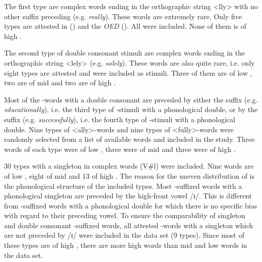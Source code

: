 The first type are complex words ending in the orthographic string <lly> with no other suffix preceding  (e.g. \textit{really}). These words are extremely rare. Only five types are attested  in  (\citealt{Davies.20082014}) and the \textit{OED} (\citealt{OED.2013}). All were included. None of them is of high .

The second type of double consonant stimuli are complex words ending in the orthographic string <lely> (e.g. \textit{solely}). These words are also quite rare, i.e. only eight  types are attested and were included as stimuli. Three of them  are of low , two are of mid  and two are of high .



Most of the -words with a double consonant are preceded by either the suffix  (e.g. \textit{educationally}), i.e. the third type of -stimuli with a phonological double, or by the suffix  (e.g. \textit{successfully}), i.e. the fourth type of -stimuli with a phonological double. Nine types of <ally>-words and nine types of <fully>-words were randomly selected from a list of available words and included in the study. Three words of each type were of low , three were of mid  and three were of high .



30 types with a singleton in complex words (V\#l) were included. Nine words are of low , eight of mid  and 13 of high . The reason for the uneven distribution of  is the phonological structure of the included types. Most -suffixed words with a phonological singleton are preceded by the high-front vowel /ɪ/. This is different from -suffixed words with a phonological double for which there is no specific bias with regard to their preceding vowel. To ensure the comparability of singleton and double consonant -suffixed words, all attested -words with a singleton which are not preceded by /ɪ/ were included in the data set (9 types). Since most of these types are of high , there are more high  words than mid and low  words in the data set. %






